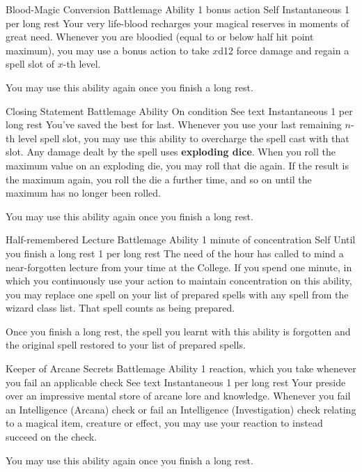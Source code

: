 \ability%
    {Blood-Magic Conversion}
    {Battlemage Ability}
    {1 bonus action}
    {Self}
    {Instantaneous}
    {1 per long rest}
Your very life-blood recharges your magical reserves
in moments of great need.
Whenever you are bloodied (equal to or below half hit point maximum),
you may use a bonus action to take $x$d12 force damage
and regain a spell slot of $x$-th level.

You may use this ability again once you finish a long rest.


\ability%
    {Closing Statement}
    {Battlemage Ability}
    {On condition}
    {See text}
    {Instantaneous}
    {1 per long rest}
You've saved the best for last.
Whenever you use your last remaining $n$-th level spell slot,
you may use this ability to overcharge the spell cast with that slot.
Any damage dealt by the spell uses \textbf{exploding dice}.
When you roll the maximum value on an exploding die,
you may roll that die again.
If the result is the maximum again,
you roll the die a further time,
and so on until the maximum has no longer been rolled.

You may use this ability again once you finish a long rest.


\ability%
    {Half-remembered Lecture}
    {Battlemage Ability}
    {1 minute of concentration}
    {Self}
    {Until you finish a long rest}
    {1 per long rest}
The need of the hour has called to mind
a near-forgotten lecture from your time at the College.
If you spend one minute, in which you continuously use your action
to maintain concentration on this ability,
you may replace one spell on your list of prepared spells
with any spell from the wizard class list.
That spell counts as being prepared.

Once you finish a long rest,
the spell you learnt with this ability is forgotten
and the original spell restored to your list of prepared spells.

\ability%
    {Keeper of Arcane Secrets}
    {Battlemage Ability}
    {1 reaction, which you take whenever you fail an applicable check}
    {See text}
    {Instantaneous}
    {1 per long rest}
Your preside over an impressive mental store
of arcane lore and knowledge.
Whenever you fail an Intelligence (Arcana) check
or fail an Intelligence (Investigation) check relating
to a magical item, creature or effect,
you may use your reaction to instead succeed on the check.

You may use this ability again once you finish a long rest.



